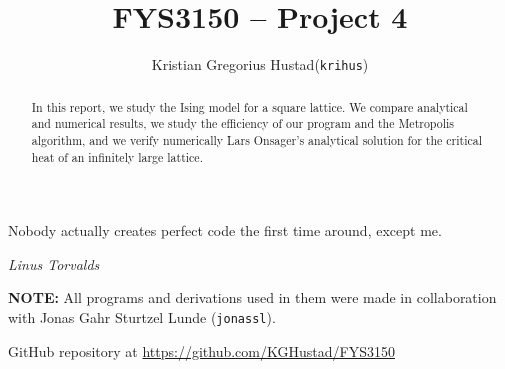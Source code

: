 \documentclass[a4paper]{article}
\begin{document}
\title{FYS3150 -- Project 4}
\author{
    \begin{tabular}{r l}
        Kristian Gregorius Hustad & (\texttt{krihus})
    \end{tabular}}

\maketitle




\setlength{\epigraphwidth}{0.75\textwidth}
\renewcommand{\epigraphflush}{center}
\renewcommand{\beforeepigraphskip}{50pt}
\renewcommand{\afterepigraphskip}{100pt}
\renewcommand{\epigraphsize}{\normalsize}

\epigraph{Nobody actually creates perfect code the first time around, except me.}
{\textit{Linus Torvalds}}


\begin{abstract}
\noindent
In this report, we study the Ising model for a square lattice. We compare analytical and numerical results, we study the efficiency of our program and the Metropolis algorithm, and we verify numerically Lars Onsager's analytical solution for the critical heat of an infinitely large lattice.
\end{abstract}

\vfill

\textbf{NOTE:} All programs and derivations used in them were made in collaboration with Jonas Gahr Sturtzel Lunde (\texttt{jonassl}).

\bigskip
\begin{center}
    GitHub repository at \url{https://github.com/KGHustad/FYS3150}
\end{center}

\newpage

\newcommand{\half}{\frac{1}{2}}
\newcommand{\dt}{{\Delta t}}
\newcommand{\dx}{{\Delta x}}
\newcommand{\bigO}{{\mathcal{O}}}

\newcommand{\stateset}{{\mathcal{S}}}
\newcommand{\expectation}[1]{{\langle #1 \rangle}}

\newcommand{\upspin}{\uparrow}
\newcommand{\downspin}{{\color{red}\downarrow}}
\end{document}
